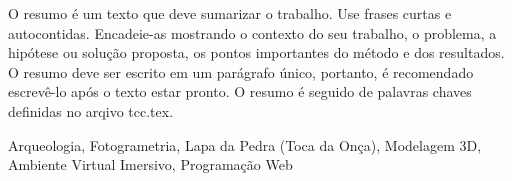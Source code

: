 O resumo é um texto que deve sumarizar o trabalho.
Use frases curtas e autocontidas. 
Encadeie-as mostrando o contexto do seu trabalho, o problema, a hipótese ou solução proposta, os pontos importantes do método e dos resultados.
O resumo deve ser escrito em um parágrafo único, portanto, é recomendado escrevê-lo após o texto estar pronto. 
O resumo é seguido de palavras chaves definidas no arqivo tcc.tex.

\begin{keywords}
Arqueologia, Fotogrametria, Lapa da Pedra (Toca da Onça), Modelagem 3D, Ambiente Virtual Imersivo, Programação Web
\end{keywords}